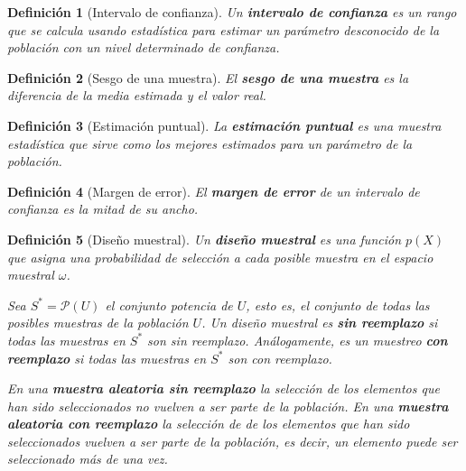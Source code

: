 \documentclass{report}
\newtheorem{definition}{Definición}
\begin{document}
\begin{definition}[Intervalo de confianza]
    Un \textbf{intervalo de confianza} es un rango que se calcula usando estadística para estimar un parámetro desconocido de la población con un nivel determinado de confianza.
\end{definition}

\bigbreak

\begin{definition}[Sesgo de una muestra]
    El \textbf{sesgo de una muestra} es la diferencia de la media estimada y el valor real.
\end{definition}

\bigbreak

\begin{definition}[Estimación puntual]
    La \textbf{estimación puntual} es una muestra estadística que sirve como los mejores estimados para un parámetro de la población.
\end{definition}

\bigbreak

\begin{definition}[Margen de error]
    El \textbf{margen de error} de un intervalo de confianza es la mitad de su ancho.
\end{definition}

\bigbreak

\begin{definition}[Diseño muestral]
    Un \textbf{diseño muestral} es una función $p(X)$ que asigna una probabilidad de selección a cada posible muestra en el espacio muestral $\omega$.
    
    \bigbreak
    
    Sea $S^* = \mathcal{P}(U)$ el conjunto potencia de $U$, esto es, el conjunto de todas las posibles muestras de la población $U$. Un diseño muestral es \textbf{sin reemplazo} si todas las muestras en $S^*$ son sin reemplazo. Análogamente, es un muestreo \textbf{con reemplazo} si todas las muestras en $S^*$ son con reemplazo.

    \bigbreak
    
    En una \textbf{muestra aleatoria sin reemplazo} la selección de los elementos que han sido seleccionados no vuelven a ser parte de la población. En una \textbf{muestra aleatoria con reemplazo} la selección de de los elementos que han sido seleccionados vuelven a ser parte de la población, es decir, un elemento puede ser seleccionado más de una vez.
\end{definition}
\end{document}
